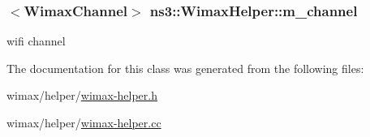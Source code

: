 \subsubsection[{\texorpdfstring{m\+\_\+channel}{m_channel}}]{$<${\bf Wimax\+Channel}$>$ ns3\+::\+Wimax\+Helper\+::m\+\_\+channel\hspace{0.3cm}{\ttfamily [private]}}\hypertarget{classns3_1_1WimaxHelper_a2d6f863b9fa5d811edd856802ecb0bc3}{}\label{classns3_1_1WimaxHelper_a2d6f863b9fa5d811edd856802ecb0bc3}


wifi channel 



The documentation for this class was generated from the following files\+:\begin{DoxyCompactItemize}
\item 
wimax/helper/\hyperlink{wimax-helper_8h}{wimax-\/helper.\+h}\item 
wimax/helper/\hyperlink{wimax-helper_8cc}{wimax-\/helper.\+cc}\end{DoxyCompactItemize}
